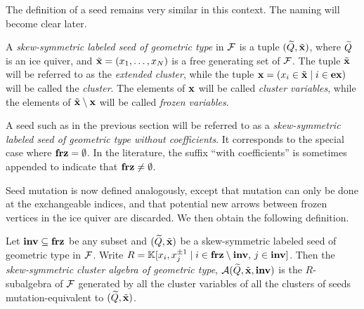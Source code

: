 The definition of a seed remains very similar in this context. The naming will become
clear later.
\begin{definition}

	A \emph{skew-symmetric labeled seed of geometric type} in $\mathcal{F}$ is a tuple $(\widetilde{Q}, \tilde{\mathbf{x}})$, where $\widetilde{Q}$ is an ice quiver, and
	$\tilde{\mathbf{x}} = (x_1, \dots, x_N)$ is a free generating set of $\mathcal{F}$. The tuple $\tilde{\mathbf{x}}$ will be
	referred to as the \emph{extended cluster}, while the tuple
	$\mathbf{x} = (x_i \in \tilde{\mathbf{x}} \mid i \in \mathbf{ex})$ will be called the \emph{cluster}. The elements
	of $\mathbf{x}$ will be called \emph{cluster variables}, while the
	elements of $\tilde{\mathbf{x}} \setminus \mathbf{x}$ will be called \emph{frozen variables}.
\end{definition}

A seed such as in the previous section will be referred to as a \emph{skew-symmetric
	labeled seed of geometric type without coefficients}. It corresponds to the special
case where $\mathbf{frz} = \emptyset$. In the literature, the suffix ``with coefficients'' is
sometimes appended to indicate that $\mathbf{frz} \neq \emptyset$.

Seed mutation is now defined analogously, except that mutation can only be done at the
exchangeable indices, and that potential new arrows between frozen vertices in the ice
quiver are discarded. We then obtain the following definition.
\begin{definition}

	Let $\mathbf{inv} \subseteq \mathbf{frz}$ be any subset and $(\widetilde{Q}, \tilde{\mathbf{x}})$ be a skew-symmetric labeled
	seed of geometric type in $\mathcal{F}$. Write $R = \mathbb{K}[x_i, x_j^{\pm 1} \mid i \in \mathbf{frz}
		\setminus \mathbf{inv},\, j \in \mathbf{inv}]$. Then the \emph{skew-symmetric cluster algebra of
		geometric type}, $\mathcal{A}(\widetilde{Q},
		\tilde{\mathbf{x}}, \mathbf{inv})$ is the $R$-subalgebra of
	$\mathcal{F}$ generated by all the cluster variables of all the clusters of seeds
	mutation-equivalent to $(\widetilde{Q}, \tilde{\mathbf{x}})$.
\end{definition}

